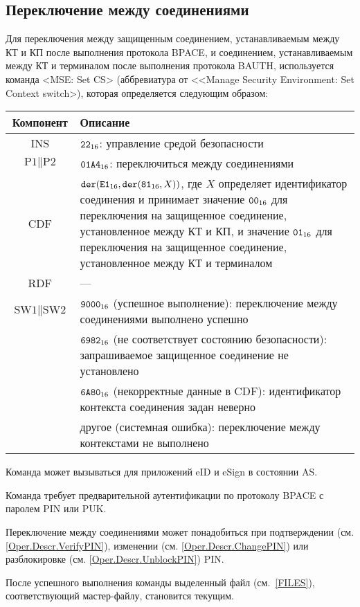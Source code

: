 \subsection{Переключение между соединениями}
\label{Oper.Descr.SetCS}
Для переключения между защищенным соединением,
устанавливаемым между КТ и КП после выполнения 
протокола BPACE, и соединением, 
устанавливаемым между КТ и терминалом после выполнения 
протокола BAUTH, используется 
команда <MSE: Set CS> (аббревиатура от <<Manage Security Environment: Set 
Context switch>),
которая определяется следующим образом:

\noindent
\begin{tabular}{|c|p{14cm}|}
\hline
Компонент & Описание \\
\hline
\hline
INS & $\texttt{22}_{16}$: управление средой безопасности\\ 
\hline
$\text{P1} \parallel\text{P2}$ & $\texttt{01A4}_{16}$: 
переключиться между соединениями \\
\hline
CDF & 
$\texttt{der}(\texttt{E1}_{16}, \texttt{der}(\texttt{81}_{16}, X))$, 
где $X$ определяет идентификатор
соединения и принимает значение $\texttt{00}_{16}$ для
переключения на защищенное соединение,
установленное между КТ и КП,
и значение $\texttt{01}_{16}$ для переключения на защищенное
соединение, установленное между КТ и терминалом\\ 
\hline \hline
RDF &  --- \\
\hline
$\text{SW1} \parallel \text{SW2}$ & 
$\texttt{9000}_{16}$ (успешное выполнение): переключение 
между соединениями выполнено успешно \\
 & $\texttt{6982}_{16}$ (не соответствует состоянию безопасности):
 запрашиваемое защищенное соединение не установлено  \\
 & $\texttt{6A80}_{16}$ (некорректные данные в CDF): 
идентификатор контекста соединения задан неверно \\
 & другое (системная ошибка): переключение 
между контекстами не выполнено  \\
\hline
\end{tabular}

Команда может вызываться для приложений eID и eSign
в состоянии AS.

Команда требует предварительной аутентификации по протоколу BPACE
с паролем PIN или PUK.

Переключение между соединениями может понадобиться
при подтверждении (см. \ref{Oper.Descr.VerifyPIN}), 
изменении (см. \ref{Oper.Descr.ChangePIN})
или разблокировке (см. \ref{Oper.Descr.UnblockPIN}) PIN.

После успешного выполнения команды выделенный файл (см.~\ref{FILES}), 
соответствующий мастер-файлу, становится текущим.

